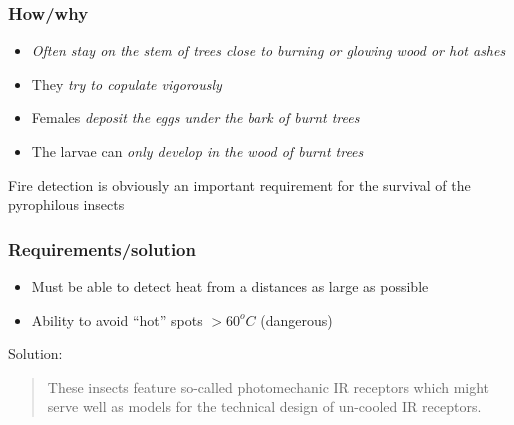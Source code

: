 \documentclass[14pt]{beamer}
\begin{document}
\begin{frame}
\frametitle{How/why}
\begin{itemize}
\item \emph{Often stay on the stem of trees close to burning or glowing wood or hot ashes}
\item They \emph{try to copulate vigorously}
\item Females \emph{deposit the eggs under the bark of burnt trees}
\item The larvae can \emph{only develop in the wood of burnt trees}
\end{itemize}
Fire detection is obviously an important requirement for the survival of the pyrophilous insects
\end{frame}

\begin{frame}
\frametitle{Requirements/solution}
\begin{itemize}
\item Must be able to detect heat from a distances as large as possible
\item Ability to avoid ``hot'' spots $>60^oC$ (dangerous)
\end{itemize}
Solution:\\
\begin{quote}
\alert{These insects feature so-called photomechanic IR receptors} which might serve well as models for the technical design of un-cooled IR receptors.
\end{quote}
\end{frame}
\end{document}
